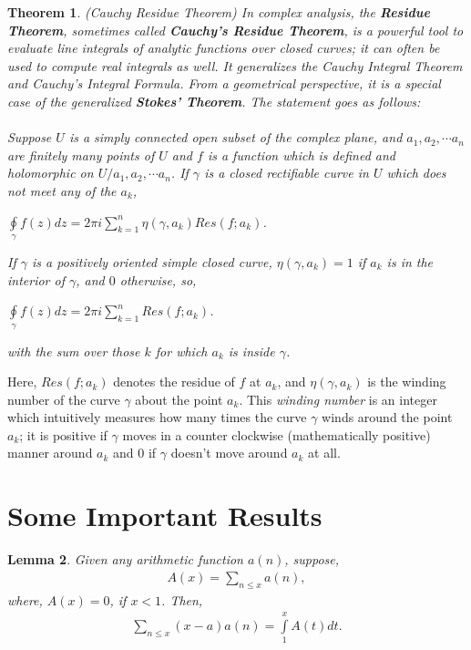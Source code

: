 \documentclass[article,12pt]{elsarticle}
\newtheorem{thm}{Theorem}[section]
\newtheorem{lemma}[thm]{Lemma}
\begin{document}
	\begin{thm}\label{thm6}
		(Cauchy Residue Theorem)  In complex analysis, the \textbf{Residue Theorem}, sometimes called \textbf{Cauchy's Residue Theorem}, is a powerful tool to evaluate line integrals of \textit{analytic functions} over closed curves; it can often be used to compute real integrals as well. It generalizes the \textit{Cauchy Integral Theorem} and \textit{Cauchy's Integral Formula}. From a geometrical perspective, it is a special case of the generalized \textbf{Stokes' Theorem}. The statement goes as follows:\\\\
		Suppose $U$ is a \textit{simply connected open subset} of the complex plane, and $a_{1},a_{2},\cdots a_{n}$ are finitely many points of $U$ and $f$ is a function which is defined and holomorphic on $U \slash {a_{1},a_{2},\cdots a_{n}}$. If $\gamma$ is a \textit{closed rectifiable curve} in $U$ which does not meet any of the $a_{k}$,
		\begin{center}
			$\oint\limits_{\gamma}f(z)dz=2\pi i\sum\limits_{k=1}^{n}\eta(\gamma, a_{k})Res(f;a_{k})$.
		\end{center}
		
		If $\gamma$ is a positively oriented simple closed curve, $\eta(\gamma, a_{k}) = 1$ if $a_{k}$ is in the interior of $\gamma$, and $0$ otherwise, so,
		\begin{center}
			$\oint\limits_{\gamma}f(z)dz=2\pi i\sum\limits_{k=1}^{n}Res(f;a_{k})$.
		\end{center}
		with the sum over those $k$ for which $a_{k}$ is inside $\gamma$.
	\end{thm}
	Here, $Res(f;a_{k})$ denotes the residue of $f$ at $a_{k}$, and $\eta(\gamma, a_{k})$ is the winding number of the curve $\gamma$ about the point $a_{k}$. This \textit{winding number} is an integer which intuitively measures how many times the curve $\gamma$ winds around the point $a_{k}$; it is positive if $\gamma$ moves in a counter clockwise (mathematically positive) manner around $a_{k}$ and $0$ if $\gamma$ doesn't move around $a_{k}$ at all.
	\vspace{10pt}
	\section{Some Important Results}
	\vspace{10pt}
	\begin{lemma}\label{lemma1}
		Given any arithmetic function $a(n)$, suppose,
		\begin{align*}
			A(x)=\sum\limits_{n\leq x}a(n),
		\end{align*}	
		where, $A(x)=0$, if $x<1$. Then,
		\begin{eqnarray}\label{4}
			\sum\limits_{n\leq x}(x-a)a(n)=\int\limits_{1}^{x}A(t)dt.
		\end{eqnarray}
	\end{lemma}
	
\end{document}
